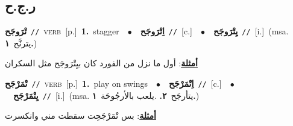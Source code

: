 \documentclass[10pt,a4paper,twoside]{article} %
\begin{document}
\begin{multicols}{2}
\vspace{-3mm}
\subsection*{\color{blue}\foreignlanguage{arabic}{ر.ج.ح}\color{blue}{}} 

{\setlength\topsep{0pt}\textbf{\foreignlanguage{arabic}{تْرَوجَح}}\ {\color{gray}\texttt{//}\color{black}}\ \textsc{verb}\ [p.]\ \textbf{1.}~stagger\ \ $\bullet$\ \ \setlength\topsep{0pt}\textbf{\foreignlanguage{arabic}{اِتْرَوجَح}}\ {\color{gray}\texttt{//}\color{black}}\ [c.]\ \ $\bullet$\ \ \setlength\topsep{0pt}\textbf{\foreignlanguage{arabic}{يِتْرَوجَح}}\ {\color{gray}\texttt{//}\color{black}}\ [i.]\ \color{gray}(msa. \foreignlanguage{arabic}{يترنَّح}~\foreignlanguage{arabic}{\textbf{١.}})\color{black}\  \begin{flushright}\color{gray}\foreignlanguage{arabic}{\textbf{\underline{\foreignlanguage{arabic}{أمثلة}}}: أول ما نزل من الفورد كان بيِتْرَوجَح مثل السكران}\end{flushright}\color{black}} \vspace{2mm}

{\setlength\topsep{0pt}\textbf{\foreignlanguage{arabic}{تْمَرْجَح}}\ {\color{gray}\texttt{//}\color{black}}\ \textsc{verb}\ [p.]\ \textbf{1.}~play on swings\ \ $\bullet$\ \ \setlength\topsep{0pt}\textbf{\foreignlanguage{arabic}{اِتْمَرْجَح}}\ {\color{gray}\texttt{//}\color{black}}\ [c.]\ \ $\bullet$\ \ \setlength\topsep{0pt}\textbf{\foreignlanguage{arabic}{يِتْمَرْجَح}}\ {\color{gray}\texttt{//}\color{black}}\ [i.]\ \color{gray}(msa. \foreignlanguage{arabic}{يتأرجَح}~\foreignlanguage{arabic}{\textbf{٢.}}  .\foreignlanguage{arabic}{يلعب بالأرجُوحَة}~\foreignlanguage{arabic}{\textbf{١.}})\color{black}\  \begin{flushright}\color{gray}\foreignlanguage{arabic}{\textbf{\underline{\foreignlanguage{arabic}{أمثلة}}}: بس تْمَرْجَحِت سقطت مني وانكسرت}\end{flushright}\color{black}} \vspace{2mm}


\end{multicols}
\end{document}
